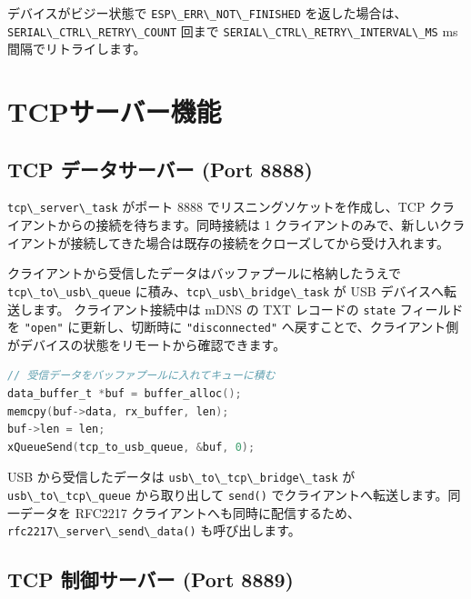 \documentclass[10pt,twoside,openany,a4j]{ltjsbook}
\newcommand{\passthrough}[1]{#1}
\begin{document}
デバイスがビジー状態で \passthrough{\lstinline!ESP\_ERR\_NOT\_FINISHED!}
を返した場合は、\passthrough{\lstinline!SERIAL\_CTRL\_RETRY\_COUNT!}
回まで \passthrough{\lstinline!SERIAL\_CTRL\_RETRY\_INTERVAL\_MS!} ms
間隔でリトライします。

\chapter{TCPサーバー機能}\label{tcpux30b5ux30fcux30d0ux30fcux6a5fux80fd}

\section{TCP データサーバー (Port
8888)}\label{tcp-ux30c7ux30fcux30bfux30b5ux30fcux30d0ux30fc-port-8888}

\passthrough{\lstinline!tcp\_server\_task!} がポート 8888
でリスニングソケットを作成し、TCP
クライアントからの接続を待ちます。同時接続は 1
クライアントのみで、新しいクライアントが接続してきた場合は既存の接続をクローズしてから受け入れます。

クライアントから受信したデータはバッファプールに格納したうえで
\passthrough{\lstinline!tcp\_to\_usb\_queue!}
に積み、\passthrough{\lstinline!tcp\_usb\_bridge\_task!} が USB
デバイスへ転送します。 クライアント接続中は mDNS の TXT レコードの
\passthrough{\lstinline!state!} フィールドを
\passthrough{\lstinline!"open"!} に更新し、切断時に
\passthrough{\lstinline!"disconnected"!}
へ戻すことで、クライアント側がデバイスの状態をリモートから確認できます。

\begin{lstlisting}[language=C]
// 受信データをバッファプールに入れてキューに積む
data_buffer_t *buf = buffer_alloc();
memcpy(buf->data, rx_buffer, len);
buf->len = len;
xQueueSend(tcp_to_usb_queue, &buf, 0);
\end{lstlisting}

USB から受信したデータは
\passthrough{\lstinline!usb\_to\_tcp\_bridge\_task!} が
\passthrough{\lstinline!usb\_to\_tcp\_queue!} から取り出して
\passthrough{\lstinline!send()!}
でクライアントへ転送します。同一データを RFC2217
クライアントへも同時に配信するため、\passthrough{\lstinline!rfc2217\_server\_send\_data()!}
も呼び出します。

\section{TCP 制御サーバー (Port
8889)}\label{tcp-ux5236ux5fa1ux30b5ux30fcux30d0ux30fc-port-8889}
\end{document}
